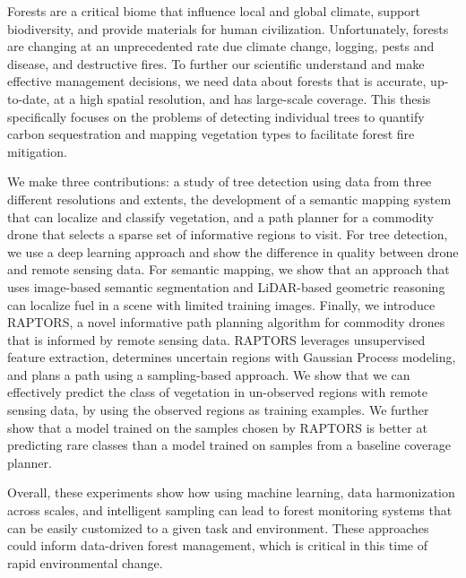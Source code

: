 
\setlength{\parskip}{1em}
\setlength{\parindent}{0em}
Forests are a critical biome that influence local and global climate, support biodiversity, and provide materials for human civilization. Unfortunately, forests are changing at an unprecedented rate due climate change, logging, pests and disease, and destructive fires. To further our scientific understand and make effective management decisions, we need data about forests that is accurate, up-to-date, at a high spatial resolution, and has large-scale coverage. This thesis specifically focuses on the problems of detecting individual trees to quantify carbon sequestration and mapping vegetation types to facilitate forest fire mitigation.

We make three contributions: a study of tree detection using data from three different resolutions and extents, the development of a semantic mapping system that can localize and classify vegetation, and a path planner for a commodity drone that selects a sparse set of informative regions to visit.
For tree detection, we use a deep learning approach and show the difference in quality between drone and remote sensing data. For semantic mapping, we show that an approach that uses image-based semantic segmentation and LiDAR-based geometric reasoning can localize fuel in a scene with limited training images. Finally, we introduce RAPTORS, a novel informative path planning algorithm for commodity drones that is informed by remote sensing data. RAPTORS leverages unsupervised feature extraction, determines uncertain regions with Gaussian Process modeling, and plans a path using a sampling-based approach. We show that we can effectively predict the class of vegetation in un-observed regions with remote sensing data, by using the observed regions as training examples. We further show that a model trained on the samples chosen by RAPTORS is better at predicting rare classes than a model trained on samples from a baseline coverage planner.

Overall, these experiments show how using machine learning, data harmonization across scales, and intelligent sampling can lead to forest monitoring systems that can be easily customized to a given task and environment. These approaches could inform data-driven forest management, which is critical in this time of rapid environmental change.

